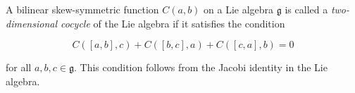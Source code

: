 A bilinear skew-symmetric function $C(a,b)$ on a Lie algebra $\mathfrak{g}$ is called a \textit{two-dimensional cocycle} of the Lie algebra if it satisfies the condition

$$C([a,b], c) + C([b,c], a) + C([c,a], b) = 0$$

for all $a, b, c \in \mathfrak{g}$. This condition follows from the Jacobi identity in the Lie algebra.
